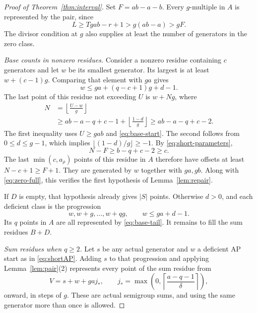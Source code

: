 \documentclass[11pt]{article}
\theoremstyle{definition}
\theoremstyle{remark}
\begin{document}
\begin{proof}[Proof of Theorem~\ref{thm:interval}]
Set $F=ab-a-b$. Every $g$-multiple in $A$ is represented by the pair,
since
\begin{equation}\label{eq:zero-full}
 L\geq Tgab-r+1>g(ab-a)>gF.
\end{equation}
The divisor condition at $g$ also supplies at least the number of
generators in the zero class.

\medskip
\noindent\emph{Base counts in nonzero residues.}
Consider a nonzero residue containing $c$ generators and let $w$ be its
smallest generator. Its largest is at least $w+(c-1)g$. Comparing that
element with $ga$ gives
\begin{equation}\label{eq:base-start}
 w\leq ga+(q-c+1)g+d-1.
\end{equation}
The last point of this residue not exceeding $U$ is $w+Ng$, where
\begin{align*}
 N&=\left\lfloor\frac{U-w}{g}\right\rfloor\\
 &\geq ab-a-q+c-1+\left\lfloor\frac{1-d}{g}\right\rfloor
 \geq ab-a-q+c-2.
\end{align*}
The first inequality uses $U\geq gab$ and \eqref{eq:base-start}.
The second follows from $0\leq d\leq g-1$, which implies
$\lfloor(1-d)/g\rfloor\geq-1$. By \eqref{eq:short-parameters},
\begin{equation}\label{eq:base-tail}
 N-F\geq b-q+c-2\geq c.
\end{equation}
The last $\min(c,a_\rho)$ points of this residue in $A$ therefore have
offsets at least $N-c+1\geq F+1$. They are generated by $w$ together
with $ga,gb$. Along with \eqref{eq:zero-full}, this verifies the first
hypothesis of Lemma~\ref{lem:repair}.

If $D$ is empty, that hypothesis already gives $|S|$ points. Otherwise
$d>0$, and each deficient class is the progression
\begin{equation}\label{eq:shortAP}
 w,w+g,\ldots,w+qg,\qquad w\leq ga+d-1.
\end{equation}
Its $q$ points in $A$ are all represented by \eqref{eq:base-tail}.
It remains to fill the sum residues $B+D$.

\medskip
\noindent\emph{Sum residues when $q\geq2$.}
Let $s$ be any actual generator and $w$ a deficient AP start as in
\eqref{eq:shortAP}. Adding $s$ to that progression and applying
Lemma~\ref{lem:pair}(2) represents every point of the sum residue
from
\[
 V=s+w+ga j_*,\qquad
 j_* =\max\left(0,\left\lceil\frac{a-q-1}{\delta}\right\rceil\right),
\]
onward, in steps of $g$. These are actual semigroup sums, and using
the same generator more than once is allowed.


\end{proof}
\end{document}

